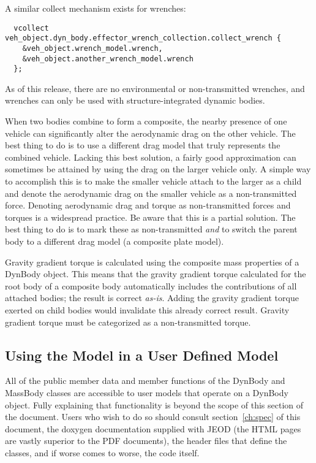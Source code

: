 A similar collect mechanism exists for wrenches:
\begin{verbatim}
  vcollect veh_object.dyn_body.effector_wrench_collection.collect_wrench {
    &veh_object.wrench_model.wrench,
    &veh_object.another_wrench_model.wrench
  };
\end{verbatim}
As of this release, there are no environmental or non-transmitted wrenches,
and wrenches can only be used with structure-integrated dynamic bodies.

When two bodies combine to form a composite, the nearby presence of one vehicle
can significantly alter the aerodynamic drag on the other vehicle. The best
thing to do is to use a different drag model that truly represents the combined
vehicle. Lacking this best solution, a fairly good approximation can sometimes
be attained by using the drag on the larger vehicle only. A simple way to
accomplish this is to make the smaller vehicle attach to the larger as a child
and denote the aerodynamic drag on the smaller vehicle as a non-transmitted
force. Denoting aerodynamic drag and torque as non-transmitted forces and
torques is a widespread practice. Be aware that this is a partial solution.
The best thing to do is to mark these as non-transmitted \emph{and} to switch the
parent body to a different drag model (\eg a composite plate model).

Gravity gradient torque is calculated using the composite mass properties of
a DynBody object. This means that the gravity gradient torque calculated for the
root body of a composite body automatically includes the contributions of all
attached bodies; the result is correct \emph{as-is}. Adding the gravity gradient
torque exerted on child bodies would invalidate this already correct result.
Gravity gradient torque must be categorized as a non-transmitted torque.

\subsection{Using the Model in a User Defined Model}
All of the public member data and member functions of the DynBody
 and MassBody classes are accessible to user models that operate
on a DynBody object. Fully explaining that functionality is beyond
the scope of this section of the document. Users who wish to do so should
consult section~\ref{ch:spec} of this document, the doxygen documentation
supplied with JEOD (the HTML pages are vastly superior to the PDF documents),
the header files that define the classes, and if worse comes to worse,
the code itself.

